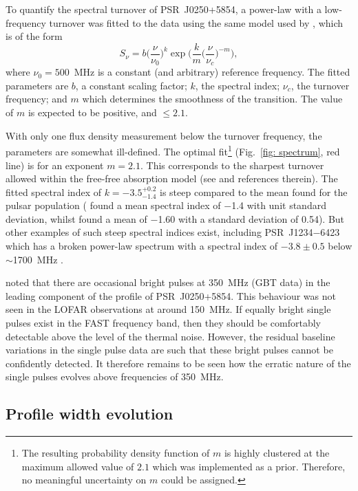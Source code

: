 To quantify the spectral turnover of PSR~J0250+5854, a power-law with a low-frequency turnover was fitted to the data using the same model used by \citet{JSK+2018}, which is of the form
\begin{equation}
    \label{eq: spectrum}
    S_\nu = b \bigg(\frac{\nu}{\nu_0}\bigg)^k \exp\bigg( \frac{k}{m} \bigg(\frac{\nu}{\nu_c}\bigg)^{-m}\bigg),
\end{equation}
where $\nu_0 = 500$~MHz is a constant (and arbitrary) reference frequency. The fitted parameters are $b$, a constant scaling factor; $k$, the spectral index; $\nu_c$, the turnover frequency; and $m$ which determines the smoothness of the transition. The value of $m$ is expected to be positive, and $\leq2.1$.

With only one flux density measurement below the turnover frequency, the parameters are somewhat ill-defined. The optimal fit\footnote{The resulting probability density function of $m$ is highly clustered at the maximum allowed value of $2.1$ which was implemented as a prior. Therefore, no meaningful uncertainty on $m$ could be assigned.} (Fig.~\ref{fig: spectrum}, red line) is for an exponent $m=2.1$. This corresponds to the sharpest turnover allowed within the free-free absorption model (see \citet{JSK+2018} and references therein). The fitted spectral index of $k = -3.5^{+0.2}_{-1.4}$ is steep compared to the mean found for the pulsar population (\citealt{BLVx2013} found a mean spectral index of $-$1.4 with unit standard deviation, whilst \citealt{JSK+2018} found a mean of $-$1.60 with a standard deviation of 0.54). But other examples of such steep spectral indices exist, including PSR~J1234$-$6423 which has a broken power-law spectrum with a spectral index of $-3.8\pm0.5$ below $\sim$1700~MHz \citep{JSK+2018}.

\citet{TBC+2018} noted that there are occasional bright pulses at 350~MHz (GBT data) in the leading component of the profile of PSR~J0250+5854. This behaviour was not seen in the LOFAR observations at around 150~MHz. If equally bright single pulses exist in the FAST frequency band, then they should be comfortably detectable above the level of the thermal noise. However, the residual baseline variations in the single pulse data are such that these bright pulses cannot be confidently detected. It therefore remains to be seen how the erratic nature of the single pulses evolves above frequencies of 350~MHz.



\subsection{Profile width evolution}
\label{sec: J0250 - discussion - width} 

